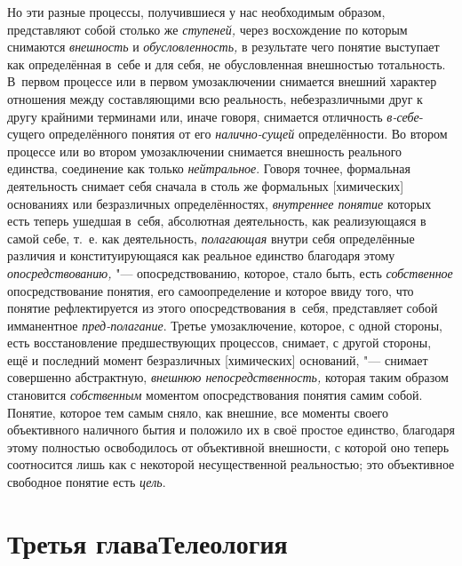 Но эти разные процессы, получившиеся у нас необходимым
образом, представляют собой столько же
{\em ступеней,} через
восхождение по которым снимаются
{\em внешность} и
{\em обусловленность,} в
результате чего понятие выступает как определённая в~себе и для себя, не
обусловленная внешностью тотальность. В~первом процессе или в первом
умозаключении снимается внешний характер отношения между составляющими всю
реальность, небезразличными друг к другу крайними терминами или, иначе
говоря, снимается отличность
{\em в-себе}-сущего
определённого понятия от его
{\em налично-сущей}
определённости. Во втором процессе или во втором
умозаключении снимается внешность реального единства, соединение как только
{\em нейтральное}. Говоря
точнее, формальная деятельность снимает себя сначала в столь же формальных
[химических] основаниях или безразличных определённостях,
{\em внутреннее понятие}
которых есть теперь ушедшая в~себя, абсолютная деятельность,
как реализующаяся в самой себе, т.~е. как деятельность,
{\em полагающая} внутри
себя определённые различия и конституирующаяся как реальное единство
благодаря этому {\em опосредствованию,}
"--- опосредствованию, которое, стало быть, есть
{\em собственное}
опосредствование понятия, его самоопределение и которое ввиду
того, что понятие рефлектируется из этого опосредствования в~себя,
представляет собой имманентное
{\em пред-полагание}.
Третье умозаключение, которое, с одной стороны, есть
восстановление предшествующих процессов, снимает, с другой стороны, ещё и
последний момент безразличных [химических] оснований, "---
снимает совершенно абстрактную,
{\em внешнюю непосредственность,}
которая таким образом становится
{\em собственным}
моментом опосредствования понятия самим собой. Понятие,
которое тем самым сняло, как внешние, все моменты своего объективного
наличного бытия и положило их в своё простое единство, благодаря этому
полностью освободилось от объективной внешности, с которой оно теперь
соотносится лишь как с некоторой несущественной реальностью; это
объективное свободное понятие есть
{\em цель}.

\chapter[Третья глава Телеология]{Третья глава\newline Телеология}


